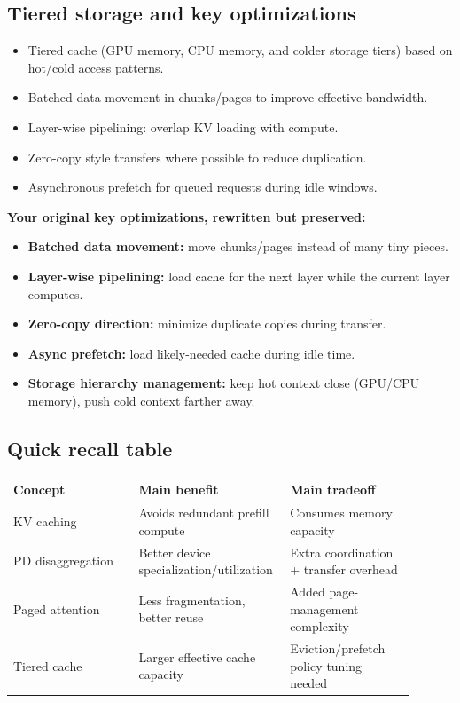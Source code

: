 \documentclass[11pt]{article}
\begin{document}
\subsection{Tiered storage and key optimizations}
\begin{itemize}[leftmargin=1.2em]
\item Tiered cache (GPU memory, CPU memory, and colder storage tiers) based on hot/cold access patterns.
\item Batched data movement in chunks/pages to improve effective bandwidth.
\item Layer-wise pipelining: overlap KV loading with compute.
\item Zero-copy style transfers where possible to reduce duplication.
\item Asynchronous prefetch for queued requests during idle windows.
\end{itemize}

\textbf{Your original key optimizations, rewritten but preserved:}
\begin{itemize}[leftmargin=1.2em]
\item \textbf{Batched data movement:} move chunks/pages instead of many tiny pieces.
\item \textbf{Layer-wise pipelining:} load cache for the next layer while the current layer computes.
\item \textbf{Zero-copy direction:} minimize duplicate copies during transfer.
\item \textbf{Async prefetch:} load likely-needed cache during idle time.
\item \textbf{Storage hierarchy management:} keep hot context close (GPU/CPU memory), push cold context farther away.
\end{itemize}

\subsection{Quick recall table}
\begin{center}
\renewcommand{\arraystretch}{1.15}
\begin{tabular}{|p{0.30\linewidth}|p{0.30\linewidth}|p{0.30\linewidth}|}
\hline
\textbf{Concept} & \textbf{Main benefit} & \textbf{Main tradeoff} \\
\hline
KV caching & Avoids redundant prefill compute & Consumes memory capacity \\
\hline
PD disaggregation & Better device specialization/utilization & Extra coordination + transfer overhead \\
\hline
Paged attention & Less fragmentation, better reuse & Added page-management complexity \\
\hline
Tiered cache & Larger effective cache capacity & Eviction/prefetch policy tuning needed \\
\hline
\end{tabular}
\end{center}
\end{document}
